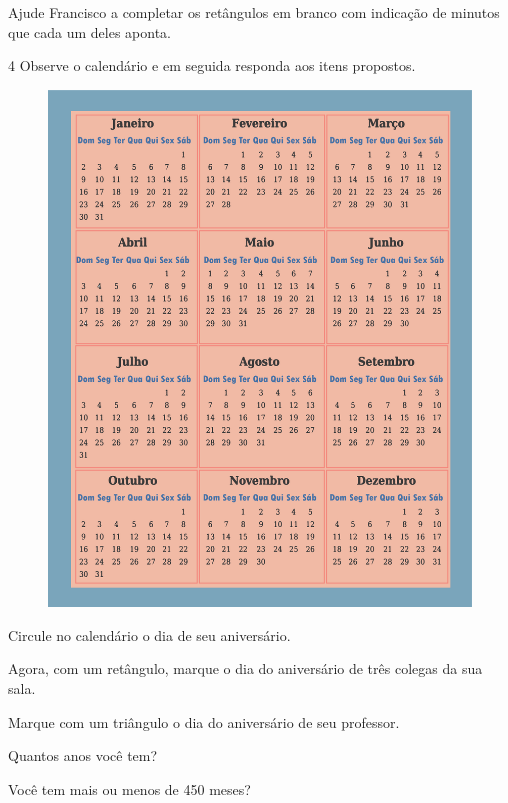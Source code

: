 Ajude Francisco a completar os retângulos em branco com indicação de
minutos que cada um deles aponta.


\num{4} Observe o calendário e em seguida responda aos itens propostos.

\begin{figure}[htpb!]
\includegraphics[width=\textwidth]{./media/image54.png}
\end{figure}

\begin{escolha}
\item Circule no calendário o dia de seu aniversário.

\item Agora, com um retângulo, marque o dia do aniversário de três colegas da sua sala.

\item Marque com um triângulo o dia do aniversário de seu professor.

\item Quantos anos você tem?

\item Você tem mais ou menos de 450 meses?
\end{escolha}

